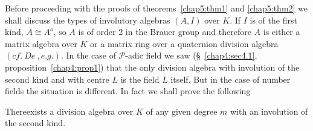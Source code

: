  Before proceeding with the proofs of theorems~\ref{chap5:thm1} and
 \ref{chap5:thm2} we shall 
 discuss the types of involutory algebras $(A,I)$ over $K$. If $I$ is
 of the first kind, $ A \cong A^o$, so $A$ is of order 2 in the
 Brauer group and therefore $A$ is either a matrix algebra over $K$ or
 a matrix ring over a quaternion division algebra $(cf.~De~,e.g.)$.  
  In the case of $\mathscr{P}$-adic field we saw (\S~\ref{chap4:sec4.1},
 proposition~\ref{chap4:prop1}) that the only division algebra with
 involution of 
 the second kind and with centre $L$ is the field $L$ itself. But in
 the case of number fields the situation is different. In fact we
 shall prove the following   
 
\setcounter{proposition}{0}
 \begin{proposition}%
There\pageoriginale exists a division algebra over $K$ of any given
degree $m$ with an involution of the second kind.  
 \end{proposition}
 
